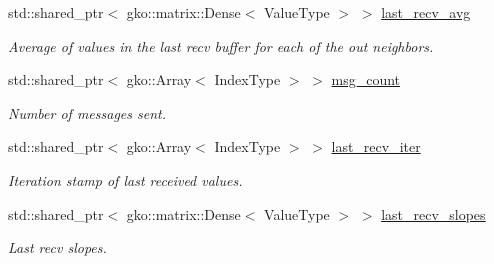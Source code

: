\begin{DoxyCompactItemize}
\mbox{\label{structschwz_1_1Communicate_1_1comm__struct_a08f577d014229ed2db068f5e8cadcbc2}} 
std\+::shared\+\_\+ptr$<$ gko\+::matrix\+::\+Dense$<$ Value\+Type $>$ $>$ \hyperlink{structschwz_1_1Communicate_1_1comm__struct_a08f577d014229ed2db068f5e8cadcbc2}{last\+\_\+recv\+\_\+avg}
\begin{DoxyCompactList}\small\item\em Average of values in the last recv buffer for each of the out neighbors. \end{DoxyCompactList}\item 
\mbox{\label{structschwz_1_1Communicate_1_1comm__struct_a5aa7956063f722e0b5490dbc251e6679}} 
std\+::shared\+\_\+ptr$<$ gko\+::\+Array$<$ Index\+Type $>$ $>$ \hyperlink{structschwz_1_1Communicate_1_1comm__struct_a5aa7956063f722e0b5490dbc251e6679}{msg\+\_\+count}
\begin{DoxyCompactList}\small\item\em Number of messages sent. \end{DoxyCompactList}\item 
\mbox{\label{structschwz_1_1Communicate_1_1comm__struct_afc9b61063cdf5ef92106220c19df143f}} 
std\+::shared\+\_\+ptr$<$ gko\+::\+Array$<$ Index\+Type $>$ $>$ \hyperlink{structschwz_1_1Communicate_1_1comm__struct_afc9b61063cdf5ef92106220c19df143f}{last\+\_\+recv\+\_\+iter}
\begin{DoxyCompactList}\small\item\em Iteration stamp of last received values. \end{DoxyCompactList}\item 
\mbox{\label{structschwz_1_1Communicate_1_1comm__struct_a8f6c826c4f13b8f3e8c611f13254fabf}} 
std\+::shared\+\_\+ptr$<$ gko\+::matrix\+::\+Dense$<$ Value\+Type $>$ $>$ \hyperlink{structschwz_1_1Communicate_1_1comm__struct_a8f6c826c4f13b8f3e8c611f13254fabf}{last\+\_\+recv\+\_\+slopes}
\begin{DoxyCompactList}\small\item\em Last recv slopes. \end{DoxyCompactList}\item 
\mbox{\label{structschwz_1_1Communicate_1_1comm__struct_a06f2c470810bc90065caee045ac8d5a0}} 

\end{DoxyCompactItemize}
